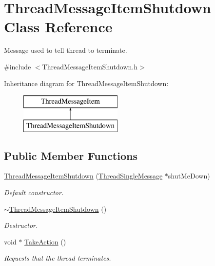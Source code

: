 \hypertarget{class_thread_message_item_shutdown}{
\section{ThreadMessageItemShutdown Class Reference}
\label{class_thread_message_item_shutdown}
}


Message used to tell thread to terminate.  




{\ttfamily \#include $<$ThreadMessageItemShutdown.h$>$}

Inheritance diagram for ThreadMessageItemShutdown:\begin{figure}[H]
\begin{center}
\leavevmode
\includegraphics[height=2.000000cm]{class_thread_message_item_shutdown}
\end{center}
\end{figure}
\subsection*{Public Member Functions}
\begin{DoxyCompactItemize}
\item 
\hypertarget{class_thread_message_item_shutdown_abeb57b4276e2ea5106a41a40271dff51}{
\hyperlink{class_thread_message_item_shutdown_abeb57b4276e2ea5106a41a40271dff51}{ThreadMessageItemShutdown} (\hyperlink{class_thread_single_message}{ThreadSingleMessage} $\ast$shutMeDown)}
\label{class_thread_message_item_shutdown_abeb57b4276e2ea5106a41a40271dff51}

\begin{DoxyCompactList}\small\item\em Default constructor. \item\end{DoxyCompactList}\item 
\hypertarget{class_thread_message_item_shutdown_a313dbcbf54e5c952ae9ad484fb303108}{
\hyperlink{class_thread_message_item_shutdown_a313dbcbf54e5c952ae9ad484fb303108}{$\sim$ThreadMessageItemShutdown} ()}
\label{class_thread_message_item_shutdown_a313dbcbf54e5c952ae9ad484fb303108}

\begin{DoxyCompactList}\small\item\em Destructor. \item\end{DoxyCompactList}\item 
void $\ast$ \hyperlink{class_thread_message_item_shutdown_ad81d60e93aba967c7f21f285d0a3df5b}{TakeAction} ()
\begin{DoxyCompactList}\small\item\em Requests that the thread terminates. \item\end{DoxyCompactList}\end{DoxyCompactItemize}
